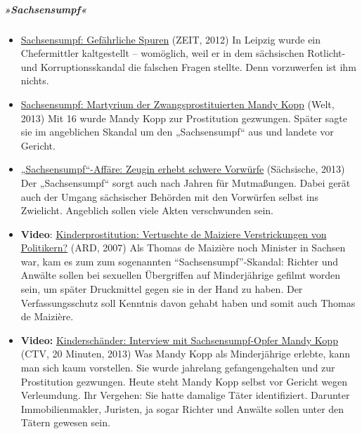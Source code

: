 \hypertarget{sachsensumpf}{%
\subparagraph{\texorpdfstring{\textbf{»Sachsensumpf«}}{»Sachsensumpf«}}\label{sachsensumpf}}

\begin{itemize}
\tightlist
\item
  \href{https://www.zeit.de/online/2007/47/sachsen-affaere}{Sachsensumpf:
  Gefährliche Spuren} (ZEIT, 2012) In Leipzig wurde ein Chefermittler
  kaltgestellt -- womöglich, weil er in dem sächsischen Rotlicht- und
  Korruptionsskandal die falschen Fragen stellte. Denn vorzuwerfen ist
  ihm nichts.
\item
  \href{https://www.welt.de/vermischtes/article114286510/Martyrium-der-Zwangsprostituierten-Mandy-Kopp.html}{Sachsensumpf:
  Martyrium der Zwangsprostituierten Mandy Kopp} (Welt, 2013) Mit 16
  wurde Mandy Kopp zur Prostitution gezwungen. Später sagte sie im
  angeblichen Skandal um den „Sachsen­sumpf`` aus und landete vor
  Gericht.
\item
  \href{https://www.saechsische.de/sachsensumpf-affaere-zeugin-erhebt-schwere-vorwuerfe--2480253.html}{„Sachsensumpf``-Affäre:
  Zeugin erhebt schwere Vorwürfe} (Sächsische, 2013) Der „Sachsensumpf``
  sorgt auch nach Jahren für Mutmaßungen. Dabei gerät auch der Umgang
  sächsischer Behörden mit den Vorwürfen selbst ins Zwielicht. Angeblich
  sollen viele Akten verschwunden sein.
\item
  \textbf{Video}:
  \href{https://www.youtube.com/watch?v=KWiQijckYKM}{Kinderprostitution:
  Vertuschte de Maiziere Verstrickungen von Politikern?} (ARD, 2007) Als
  Thomas de Maizière noch Minister in Sachsen war, kam es zum zum
  sogenannten ``Sachsensumpf''-Skandal: Richter und Anwälte sollen bei
  sexuellen Übergriffen auf Minderjährige gefilmt worden sein, um später
  Druckmittel gegen sie in der Hand zu haben. Der Verfassungsschutz soll
  Kenntnis davon gehabt haben und somit auch Thomas de Maizière.
\item
  \textbf{Video:}
  \href{https://www.youtube.com/watch?v=COugbW5icss}{Kinderschänder:
  Interview mit Sachsensumpf-Opfer Mandy Kopp} (CTV, 20 Minuten, 2013)
  Was Mandy Kopp als Minderjährige erlebte, kann man sich kaum
  vorstellen. Sie wurde jahrelang gefangengehalten und zur Prostitution
  gezwungen. Heute steht Mandy Kopp selbst vor Gericht wegen
  Verleumdung. Ihr Vergehen: Sie hatte damalige Täter identifiziert.
  Darunter Immo­bilien­makler, Juristen, ja sogar Richter und Anwälte
  sollen unter den Tätern gewesen sein.
\end{itemize}

